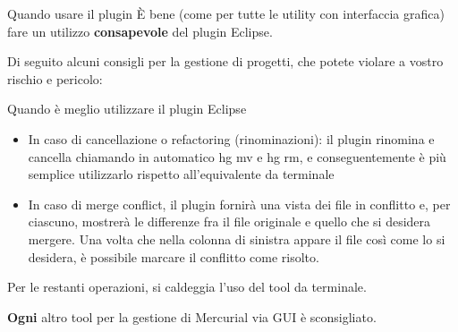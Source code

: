 \documentclass[presentation]{beamer}
\begin{document}
\begin{frame}{Quando usare il plugin}
	È bene (come per tutte le utility con interfaccia grafica) fare un utilizzo \textbf{consapevole} del plugin Eclipse.
	
	Di seguito alcuni consigli per la gestione di progetti, che potete violare a vostro rischio e pericolo:
	
	\begin{block}{Quando è meglio utilizzare il plugin Eclipse}
		\begin{itemize}
			\item In caso di cancellazione o refactoring (rinominazioni): il plugin rinomina e cancella chiamando in automatico hg mv e hg rm, e conseguentemente è più semplice utilizzarlo rispetto all'equivalente da terminale
			\item In caso di merge conflict, il plugin fornirà una vista dei file in conflitto e, per ciascuno, mostrerà le differenze fra il file originale e quello che si desidera mergere. Una volta che nella colonna di sinistra appare il file così come lo si desidera, è possibile marcare il conflitto come risolto.
		\end{itemize}
	\end{block}
	
	Per le restanti operazioni, si caldeggia l'uso del tool da terminale.
	
	\textbf{Ogni} altro tool per la gestione di Mercurial via GUI è sconsigliato.
\end{frame}
\end{document}
